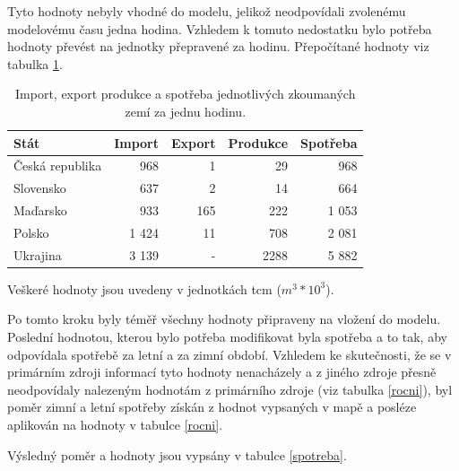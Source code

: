 \documentclass[a4paper,11pt]{article}
\begin{document}
Tyto hodnoty nebyly vhodné do modelu, jelikož neodpovídali
zvolenému modelovému času jedna hodina. 
Vzhledem k tomuto nedostatku bylo potřeba hodnoty převést na jednotky přepravené za hodinu.
Přepočítané hodnoty viz tabulka \ref{tabulka2}. 

\begin{table}[h!]
\begin{center}
\begin{tabular}{|l|r|r|r|r|}
    \hline
    Stát 			& Import 	& Export & Produkce & Spotřeba \\
    \hline 
    Česká republika	& 968 		& 1 		& 29		& 968\\ 
    Slovensko 		& 637		& 2		& 14		& 664\\
    Maďarsko 		& 933		& 165	& 222	& 1 053\\
    Polsko 			& 1 424		& 11		& 708	& 2 081\\
    Ukrajina 		& 3 139	 	& -		& 2288	& 5 882 \\ \hline
\end{tabular}
\caption{Import, export produkce a spotřeba jednotlivých zkoumaných zemí za jednu hodinu.}

Veškeré hodnoty jsou uvedeny v jednotkách tcm ($m^3 * 10^3$)\footnotemark.
\label{tabulka2}
\end{center}
\end{table}

Po tomto kroku byly téměř všechny hodnoty připraveny na vložení do modelu.
Poslední hodnotou, kterou bylo potřeba modifikovat byla spotřeba a to tak,
aby odpovídala spotřebě za letní a za zimní období.
Vzhledem ke skutečnosti, že se v primárním zdroji informací tyto hodnoty nenacházely
a z jiného zdroje přesně neodpovídaly nalezeným hodnotám z primárního zdroje
(viz tabulka \ref{rocni}),
byl poměr zimní a letní spotřeby získán z hodnot vypsaných v mapě \cite{Mapka staty}
a posléze aplikován na hodnoty v tabulce \ref{rocni}.

Výsledný poměr a hodnoty jsou vypsány v tabulce
\ref{spotreba}.
\end{document}
